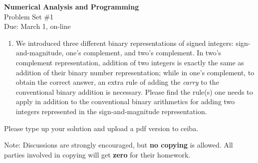 \documentclass[12pt]{article}
\begin{document}
\begin{center}
\Large
\textbf{Numerical Analysis and Programming}\\
\large
Problem Set \#1\\
Due: March 1, on-line
\end{center}
\begin{enumerate}
\item We introduced three different binary representations of signed integers: sign-and-magnitude, one's complement, and two's complement. In two's complement representation, addition of two integers is exactly the same as addition of their binary number representation; while in one's complement, to obtain the correct answer, an extra rule of adding the \textit{carry}  to the conventional binary addition is necessary. Please find the rule(s) one needs to apply in addition to the conventional binary arithmetics for adding two integers represented  in the sign-and-magnitude representation. 
\end{enumerate}
Please type up your solution and upload a pdf version to ceiba. 

Note: Discussions are strongly encouraged, but \textbf{no copying} is allowed. All parties involved in copying will get \textbf{zero} for their homework. 
\end{document}
